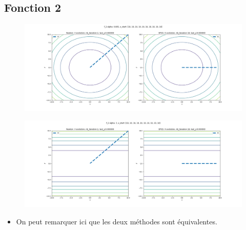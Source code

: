 \documentclass[twoside,10pt,a4paper]{article}
\numberwithin{equation}{section}					%
\numberwithin{figure}{section}						%
\begin{document}
\subsection{Fonction 2 }\label{sec:subsection2}
\begin{figure}[H]
    \centering
    \includegraphics[width=\textwidth]{imgs/comparaison/f_2_a-0.005.png}
    \caption{}
\end{figure}
\begin{figure}[H]
    \centering
    \includegraphics[width=\textwidth]{imgs/comparaison/f_2_a-3.png}
    \caption{}
\end{figure}
\begin{itemize}
	\item On peut remarquer ici que les deux méthodes sont équivalentes.
\end{itemize}
\end{document}
